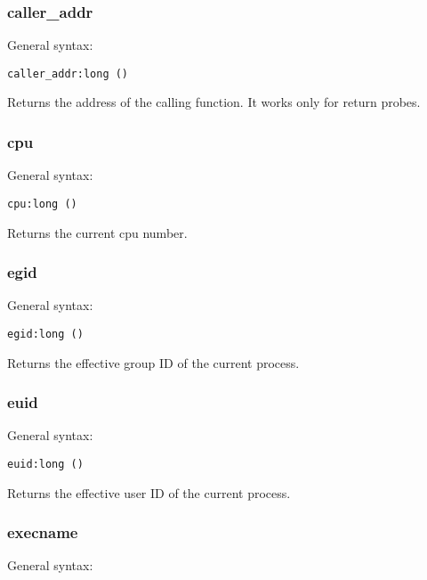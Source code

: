 \documentclass[twoside,english]{article}
\newenvironment{vindent}
{\begin{list}{}{\setlength{\listparindent}{6pt}}
\item[]}
{\end{list}}
\begin{document}
\subsubsection{caller\_addr}
General syntax:

\begin{vindent}
\begin{verbatim}
caller_addr:long ()
\end{verbatim}
\end{vindent}
Returns the address of the calling function. It works only
for return probes.


\subsubsection{cpu}
General syntax:

\begin{vindent}
\begin{verbatim}
cpu:long ()
\end{verbatim}
\end{vindent}
Returns the current cpu number.


\subsubsection{egid}
General syntax:

\begin{vindent}
\begin{verbatim}
egid:long ()
\end{verbatim}
\end{vindent}
Returns the effective group ID of the current process.


\subsubsection{euid}
General syntax:

\begin{vindent}
\begin{verbatim}
euid:long ()
\end{verbatim}
\end{vindent}
Returns the effective user ID of the current process.


\subsubsection{execname}
General syntax:
\end{document}
